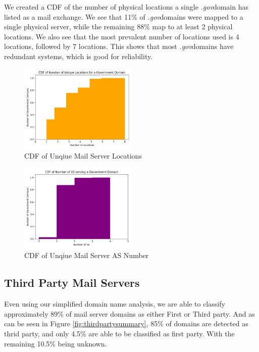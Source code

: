 \documentclass{hotnets21}
\newcommand{\dotgov}{\textit{.gov}\space}
\begin{document}
We created a CDF of the number of physical locations a single \dotgov domain has listed as a mail exchange.
We see that 11\% of \dotgov domains were mapped to a single physical server, while the remaining 88\% map to at least 2 physical locations.
We also see that the most prevalent number of locations used is 4 locations, followed by 7 locations.
This shows that most \dotgov domains have redundant systems, which is good for reliability.

\begin{figure}
\label{fig:locationcdf}
\noindent\includegraphics[width=0.5\textwidth]{Summary/Location Count CDF.png}
\caption{CDF of Unqiue Mail Server Locations}
\end{figure}

\begin{figure}
\label{fig:asncdf}
\noindent\includegraphics[width=0.5\textwidth]{Summary/ASN Count CDF.png}
\caption{CDF of Unqiue Mail Server AS Number}
\end{figure}

\subsection{Third Party Mail Servers}

Even using our simplified domain name analysis, we are able to classify approximately 89\% of mail server domains as either First or Third party.
And as can be seen in Figure \ref{fig:thirdpartysummary}, 85\% of domains are detected as thrid party, and only 4.5\% are able to be classified as first party.
With the remaining 10.5\% being unknown.
\end{document}
